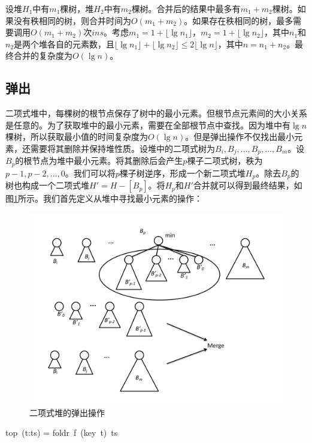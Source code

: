\documentclass[b5paper]{ctexart}
\begin{document}
设堆$H_1$中有$m_1$棵树，堆$H_2$中有$m_2$棵树。合并后的结果中最多有$m_1 + m_2$棵树。如果没有秩相同的树，则合并时间为$O(m_1 + m_2)$。如果存在秩相同的树，最多需要调用$O(m_1 + m_2)$次$ins$。考虑$m_1 = 1 + \lfloor \lg n_1 \rfloor$，$m_2 = 1 + \lfloor \lg n_2 \rfloor$，其中$n_1$和$n_2$是两个堆各自的元素数，且$\lfloor \lg n_1 \rfloor + \lfloor \lg n_2 \rfloor \leq 2 \lfloor \lg n \rfloor$，其中$n = n_1 + n_2$。最终合并的复杂度为$O(\lg n)$。

\subsection{弹出}

二项式堆中，每棵树的根节点保存了树中的最小元素。但根节点元素间的大小关系是任意的。为了获取堆中的最小元素，需要在全部根节点中查找。因为堆中有$\lg n$棵树，所以获取最小值的时间复杂度为$O(\lg n)$。但是弹出操作不仅找出最小元素，还需要将其删除并保持堆性质。设堆中的二项式树为$B_i, B_j, ..., B_p, ..., B_m$。设$B_p$的根节点为堆中最小元素。将其删除后会产生$p$棵子二项式树，秩为$p-1, p-2, ..., 0$。我们可以将$p$棵子树逆序，形成一个新二项式堆$H_p$。除去$B_p$的树也构成一个二项式堆$H' = H - [B_p]$。将$H_p$和$H'$合并就可以得到最终结果，如图\ref{fig:bheap-del-min}所示。我们首先定义从堆中寻找最小元素的操作：

\begin{figure}[htbp]
  \centering
  \includegraphics[scale=0.4]{img/bheap-pop}
  \caption{二项式堆的弹出操作}
  \label{fig:bheap-del-min}
\end{figure}

\be
top\ (t:ts) = foldr\ f\ (key\ t)\ ts
\ee
\end{document}
